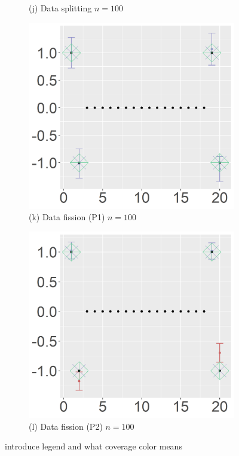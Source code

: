 \begin{figure}[ht!]
\begin{subfigure}[b]{.32\columnwidth}
    \caption{(j) Data splitting $n=100$}
\end{subfigure}
\hfill
\centering
\begin{subfigure}[b]{.32\columnwidth} 
    \includegraphics[width=\columnwidth]{../../plot/p1_100_1_1.png}
    \caption{(k) Data fission (P1) $n=100$}
\end{subfigure}
\hfill
\centering
\begin{subfigure}[b]{.32\columnwidth} 
    \includegraphics[width=\columnwidth]{../../plot/p2_100_1_1.png}
    \caption{(l) Data fission (P2) $n=100$}
    \label{fig:p2_100}
\end{subfigure}
\caption{introduce legend and what coverage color means}
\label{fig:individual}
\end{figure}